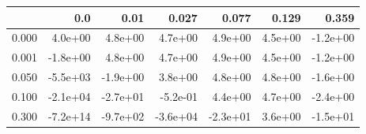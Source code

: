 \begin{tabular}{lrrrrrr}
\toprule
{} &      0.0 &     0.01 &    0.027 &    0.077 &   0.129 &    0.359 \\
\midrule
0.000 &  4.0e+00 &  4.8e+00 &  4.7e+00 &  4.9e+00 & 4.5e+00 & -1.2e+00 \\
0.001 & -1.8e+00 &  4.8e+00 &  4.7e+00 &  4.9e+00 & 4.5e+00 & -1.2e+00 \\
0.050 & -5.5e+03 & -1.9e+00 &  3.8e+00 &  4.8e+00 & 4.8e+00 & -1.6e+00 \\
0.100 & -2.1e+04 & -2.7e+01 & -5.2e-01 &  4.4e+00 & 4.7e+00 & -2.4e+00 \\
0.300 & -7.2e+14 & -9.7e+02 & -3.6e+04 & -2.3e+01 & 3.6e+00 & -1.5e+01 \\
\bottomrule
\end{tabular}
